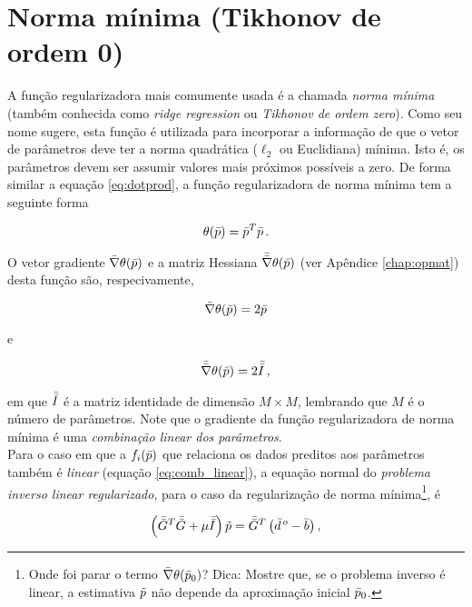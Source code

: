 \section{Norma mínima (Tikhonov de ordem 0)}

A função regularizadora mais comumente usada é a chamada {\it norma mínima}
(também conhecida como {\it ridge regression} ou {\it Tikhonov de ordem zero}).
Como seu nome sugere, esta função é utilizada para incorporar a informação de
que o vetor de parâmetros deve ter a norma quadrática ($\ell_2$ ou Euclidiana)
mínima.
Isto é, os parâmetros devem ser assumir valores mais próximos possíveis a zero.
De forma similar a equação \ref{eq:dotprod}, a função regularizadora de norma
mínima tem a seguinte forma

\begin{equation}
\theta(\bar{p}) = \bar{p}^T\bar{p} \thinspace .
\label{eq:norma_minima}
\end{equation}

\indent O vetor gradiente $\bar{\nabla}\theta(\bar{p})$ e a matriz Hessiana
$\bar{\bar{\nabla}}\theta(\bar{p})$ (ver Apêndice \ref{chap:opmat}) desta função
são, respecivamente,

\begin{equation}
\bar{\nabla}\theta(\bar{p}) = 2\bar{p}
\label{eq:grad_norma_minima}
\end{equation}

\noindent e

\begin{equation}
\bar{\bar{\nabla}}\theta(\bar{p}) = 2\bar{\bar{I}} \thinspace ,
\label{eq:hessian_norma_minima}
\end{equation}

\noindent em que $\bar{\bar{I}}$ é a matriz identidade de dimensão $M \times M$,
lembrando que $M$ é o número de parâmetros.
Note que o gradiente da função regularizadora de norma mínima é uma
{\it combinação linear dos parâmetros}.
\\
\indent Para o caso em que a $f_i(\bar{p})$ que relaciona
os dados preditos aos parâmetros também é {\it linear} (equação \ref{eq:comb_linear}),
a equação normal do {\it problema inverso linear regularizado},
para o caso da regularização de norma mínima\footnote{
Onde foi parar o termo $\bar{\nabla}\theta(\bar{p}_0)$? Dica: Mostre que, se o
problema inverso é linear, a estimativa $\tilde{p}$ não depende da aproximação
inicial $\bar{p}_0$.}, é

\begin{equation}
\left(\bar{\bar{G}}^T\bar{\bar{G}} + \mu\bar{\bar{I}}\right)\tilde{p} =
    \bar{\bar{G}}^T\left(\bar{d}^{\thinspace o} - \bar{b} \right) ,
\label{eq:sistema_normal_norma_min_linear}
\end{equation}

